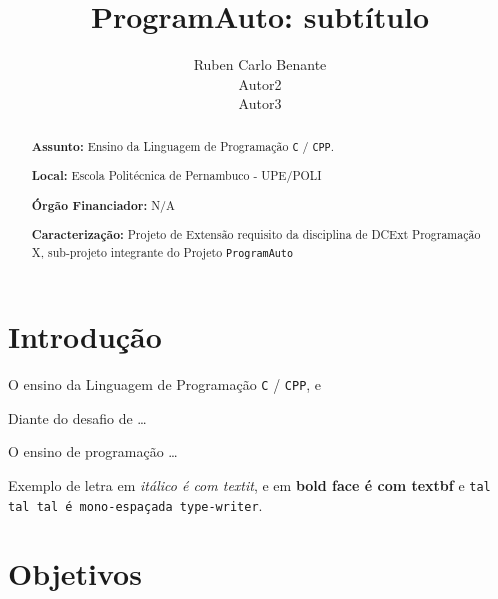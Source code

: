 \documentclass[a4paper,12pt]{article} %
\title{ProgramAuto: subtítulo}
\author{Ruben Carlo Benante \\ Autor2 \\ Autor3}
\begin{document}
\maketitle



\begin{abstract}

\textbf{Assunto:} Ensino da Linguagem de Programação \texttt{C} / \texttt{CPP}.


\textbf{Local:} Escola Politécnica de Pernambuco - UPE/POLI

\textbf{Órgão Financiador:} N/A

\textbf{Caracterização:} Projeto de Extensão requisito da disciplina de DCExt Programação X, sub-projeto integrante do Projeto \texttt{ProgramAuto}


\end{abstract}


\section{Introdução}


O ensino da Linguagem de Programação \texttt{C} / \texttt{CPP}, e

Diante do desafio de \ldots

O ensino de programação \ldots

Exemplo de letra em \textit{itálico é com textit}, e em \textbf{bold face é com textbf} e \texttt{tal tal tal é mono-espaçada type-writer}.


\section{Objetivos}
\end{document}
